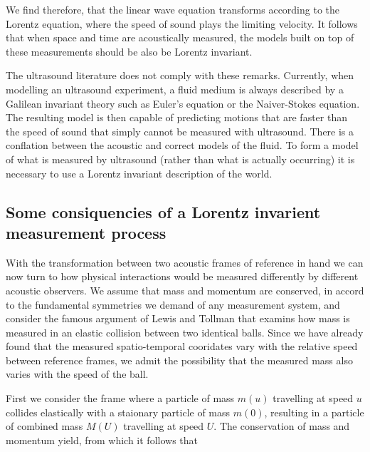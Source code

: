 We find therefore, that the linear wave equation transforms according to the Lorentz equation, where the speed of sound plays the limiting velocity.
It follows that when space and time are acoustically measured,
the models built on top of these measurements should be also be Lorentz invariant.

The ultrasound literature does not comply with these remarks.
Currently, when modelling an ultrasound experiment, a fluid medium is always described by a Galilean invariant theory such as Euler's equation or the Naiver-Stokes equation.
The resulting model is then capable of predicting motions that are faster than the speed of sound
that simply cannot be measured with ultrasound.
There is a conflation between the acoustic and correct models of the fluid.
To form a model of what is measured by ultrasound (rather than what is actually occurring)
it is necessary to use a Lorentz invariant description of the world.

\subsection{Some consiquencies of a Lorentz invarient measurement process}

With the transformation between two acoustic frames of reference in hand
we can now turn to how physical interactions would be measured differently by different acoustic observers.
We assume that mass and momentum are conserved,
in accord to the fundamental symmetries we demand of any measurement system,
and consider the famous argument of Lewis and Tollman\cite{LewisTollman, PauliBook, DIvernoBook}
that examins how mass is measured in an elastic collision between two identical balls.
Since we have already found that the measured spatio-temporal cooridates vary with the relative speed between reference frames,
we admit the possibility that the measured mass also varies with the speed of the ball.


First we consider the frame where a particle of mass $m(u)$ travelling at speed $u$ collides elastically
with a staionary particle of mass $m(0)$, resulting in a particle of combined mass $M(U)$ travelling at speed $U$.
The conservation of mass and momentum yield,
from which it follows that

